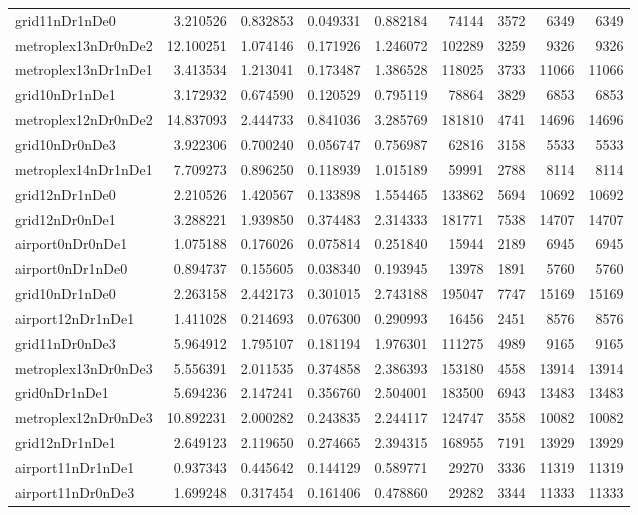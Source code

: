 \begin{longtable}{|l|r|r|r|r|r|r|r|r|}
grid11nDr1nDe0 & 3.210526 & 0.832853 & 0.049331 & 0.882184 & 74144 & 3572 & 6349 & 6349 \\
metroplex13nDr0nDe2 & 12.100251 & 1.074146 & 0.171926 & 1.246072 & 102289 & 3259 & 9326 & 9326 \\
metroplex13nDr1nDe1 & 3.413534 & 1.213041 & 0.173487 & 1.386528 & 118025 & 3733 & 11066 & 11066 \\
grid10nDr1nDe1 & 3.172932 & 0.674590 & 0.120529 & 0.795119 & 78864 & 3829 & 6853 & 6853 \\
metroplex12nDr0nDe2 & 14.837093 & 2.444733 & 0.841036 & 3.285769 & 181810 & 4741 & 14696 & 14696 \\
grid10nDr0nDe3 & 3.922306 & 0.700240 & 0.056747 & 0.756987 & 62816 & 3158 & 5533 & 5533 \\
metroplex14nDr1nDe1 & 7.709273 & 0.896250 & 0.118939 & 1.015189 & 59991 & 2788 & 8114 & 8114 \\
grid12nDr1nDe0 & 2.210526 & 1.420567 & 0.133898 & 1.554465 & 133862 & 5694 & 10692 & 10692 \\
grid12nDr0nDe1 & 3.288221 & 1.939850 & 0.374483 & 2.314333 & 181771 & 7538 & 14707 & 14707 \\
airport0nDr0nDe1 & 1.075188 & 0.176026 & 0.075814 & 0.251840 & 15944 & 2189 & 6945 & 6945 \\
airport0nDr1nDe0 & 0.894737 & 0.155605 & 0.038340 & 0.193945 & 13978 & 1891 & 5760 & 5760 \\
grid10nDr1nDe0 & 2.263158 & 2.442173 & 0.301015 & 2.743188 & 195047 & 7747 & 15169 & 15169 \\
airport12nDr1nDe1 & 1.411028 & 0.214693 & 0.076300 & 0.290993 & 16456 & 2451 & 8576 & 8576 \\
grid11nDr0nDe3 & 5.964912 & 1.795107 & 0.181194 & 1.976301 & 111275 & 4989 & 9165 & 9165 \\
metroplex13nDr0nDe3 & 5.556391 & 2.011535 & 0.374858 & 2.386393 & 153180 & 4558 & 13914 & 13914 \\
grid0nDr1nDe1 & 5.694236 & 2.147241 & 0.356760 & 2.504001 & 183500 & 6943 & 13483 & 13483 \\
metroplex12nDr0nDe3 & 10.892231 & 2.000282 & 0.243835 & 2.244117 & 124747 & 3558 & 10082 & 10082 \\
grid12nDr1nDe1 & 2.649123 & 2.119650 & 0.274665 & 2.394315 & 168955 & 7191 & 13929 & 13929 \\
airport11nDr1nDe1 & 0.937343 & 0.445642 & 0.144129 & 0.589771 & 29270 & 3336 & 11319 & 11319 \\
airport11nDr0nDe3 & 1.699248 & 0.317454 & 0.161406 & 0.478860 & 29282 & 3344 & 11333 & 11333 \\

\end{longtable}
